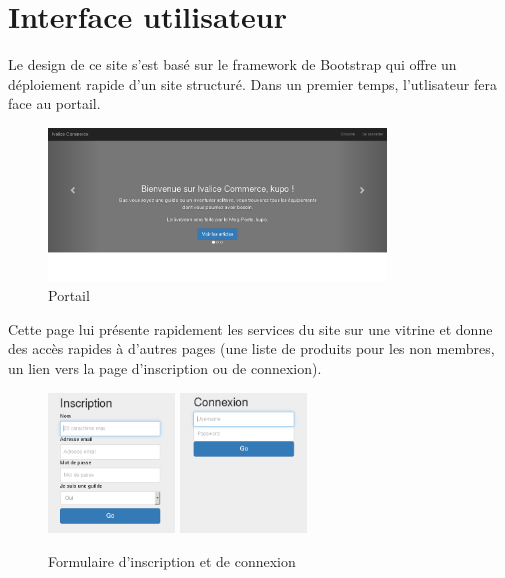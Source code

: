 \section{Interface utilisateur}

Le design de ce site s'est basé sur le framework de Bootstrap qui offre un 
déploiement rapide d'un site structuré. Dans un premier temps, l'utlisateur 
fera face au portail. \\

\begin{figure}[h!]
	\centering
	\includegraphics[width=0.8\textwidth]{img/portal.png}
	\caption{Portail}
\end{figure}

Cette page lui présente rapidement les services du site 
sur une vitrine et donne des accès rapides à d'autres pages (une liste de produits pour les 
non membres, un lien vers la page d'inscription ou de connexion). \\

\begin{figure}[h!]
	\centering
	\includegraphics[width=0.3\textwidth]{img/signup.png}
	\includegraphics[width=0.3\textwidth]{img/login.png}
	\caption{Formulaire d'inscription et de connexion}
\end{figure}


